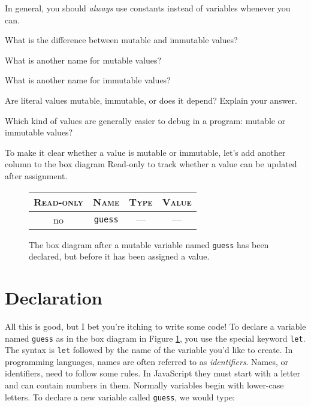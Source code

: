 \begin{center}
   In general, you should \emph{always} use constants instead of variables whenever you can.
\end{center}

\begin{question}
  What is the difference between mutable and immutable values?
\end{question}

\begin{question}
  What is another name for mutable values?
\end{question}

\begin{question}
  What is another name for immutable values?
\end{question}

\begin{question}
  Are literal values mutable, immutable, or does it depend? Explain your answer.
\end{question}

\begin{question}
  Which kind of values are generally easier to debug in a program: mutable or immutable values?
\end{question}

To make it clear whether a value is mutable or immutable, let's add another column to the box diagram \textsf{Read-only} to track whether a value can be updated after assignment.

\begin{figure}[h]
  \begin{tabular}{|c|c|c|c|}
    \hline
    \textsc{Read-only} & \textsc{Name} & \textsc{Type} & \textsc{Value}\\
    \hline
    no & \texttt{guess} & --- & ---\\
    \hline
  \end{tabular}
  \caption{\label{fig:intro-declared-variable} The box diagram after a mutable variable named \texttt{guess} has been declared, but before it has been assigned a value.}
\end{figure}

\section{Declaration}
All this is good, but I bet you're itching to write some code! To declare a variable named \texttt{guess} as in the box diagram in Figure \ref{fig:intro-declared-variable}, you use the special keyword \texttt{let}. The syntax is \texttt{let} followed by the name of the variable you'd like to create. In programming languages, names are often referred to as \emph{identifiers}. Names, or identifiers, need to follow some rules. In JavaScript they must start with a letter and can contain numbers in them. Normally variables begin with lower-case letters. To declare a new variable called \texttt{guess}, we would type:

